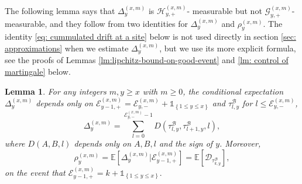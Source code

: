 \documentclass[twoside,12pt, a4paper, final]{article}
\newtheorem{lemma}{Lemma}[section]
\numberwithin{equation}{section}
\theoremstyle{remark}
\newcommand{\edt}[1]{\textcolor{red}{#1}} %
\begin{document}
	The following lemma says that $\Delta^{(x,m)}_{y}$ is $\mathcal{H}_{y, +}^{(x,m)}$- measurable but not $\mathcal{G}_{y, +}^{(x,m)}$- measurable, and they follow from two identities for $\Delta^{(x,m)}_{y}$ and $\rho_{y}^{(x,m)}$. The identity \eqref{eq: cummulated drift at a site} below is not used directly in section \ref{sec: approximations} when we estimate $\Delta^{(x,m)}_{y}$, but we use its more explicit formula, see the proofs of Lemmas \ref{lm:lipchitz-bound-on-good-event} and \ref{lm: control of martingale} below.
	\begin{lemma}\label{lm: identities for Del, rho} 
		For any integers $m,y\geq x$ with $m\geq 0$, the conditional expectation $\Delta^{(x,m)}_{y}$ depends only on $ \mathcal{E}_{y-1,+}^{(x,m)} = \mathcal{E}_{y,-}^{(x,m)} + \mathbb{1}_{ \left\{ 1\leq y \leq x \right\} }$ and $ \tau^{\mathcal{B}}_{l,y}$ for $l\leq \mathcal{E}^{(x,m)}_{y,-} $,
		\begin{equation} \label{eq: cummulated drift at a site}
			\Delta_{y}^{(x,m)} = \sum_{l=0 }^{ \mathcal{E}^{(x,m)}_{y,-} -1  } D\left(\tau^{\mathcal{B}}_{l,y},\tau^{\mathcal{B}}_{l+1,y},l \right),
		\end{equation}	
		where $D(A,B,l)$ depends only on $A,B,l$ and the sign of $y$.
		Moreover, 
		\begin{equation} \label{eq: conditional mean in GPU represenetation}
			\rho_{y}^{(x,m)} = \mathbb{E}\left[ \Delta_{y}^{(x,m)}\vert \mathcal{E}^{(x,m)}_{y-1,+} \right]	  
			= \mathbb{E}\left[  \mathcal{D}_{\tau^{\mathcal{B}}_{k,y}} \right],
		\end{equation} 
		on the event that $\mathcal{E}^{(x,m)}_{y-1,+}  = k + \mathbb{1}_{\left\{1\leq y\leq x\right\}}.$
	\end{lemma}
\end{document}
